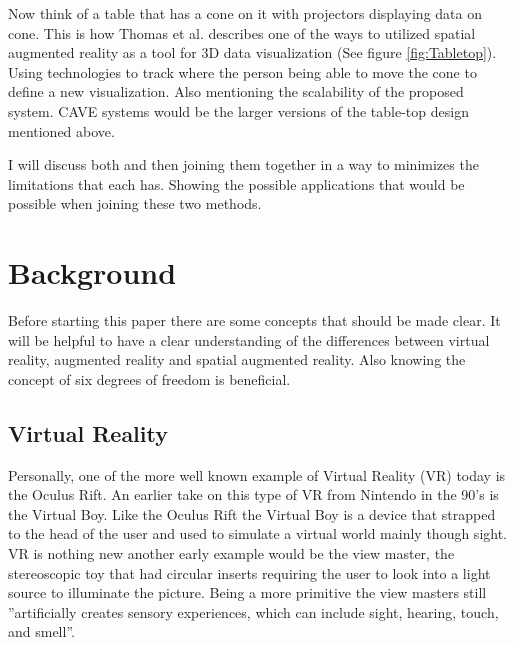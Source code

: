 \documentclass{sig-alternate}
\begin{document}
Now think of a table that has a cone on it with projectors displaying data on cone. This is how Thomas et al. describes one of the ways to utilized spatial augmented reality as a tool for 3D data visualization (See figure \ref{fig:Tabletop}). Using technologies to track where the person being able to move the cone to define a new visualization. Also mentioning the scalability of the proposed system. CAVE systems would be the larger versions of the table-top design mentioned above.      

I will discuss both and then joining them together in a way to minimizes the limitations that each has. Showing the possible applications that would be possible when joining these two methods.       


\section{Background}
\label{sec:background} 
Before starting this paper there are some concepts that should be made clear. It will be helpful to have a clear understanding of the differences between virtual reality, augmented reality and spatial augmented reality. Also knowing the concept of six degrees of freedom is beneficial.  

\subsection{Virtual Reality}
\label{sec:Virtual Reality}
Personally, one of the more well known example of Virtual Reality (VR) today is the Oculus Rift. An earlier take on this type of VR from Nintendo in the 90's is the Virtual Boy. Like the Oculus Rift the Virtual Boy is a device that strapped to the head of the user and used to simulate a virtual world mainly though sight. VR is nothing new another early example would be the view master, the stereoscopic toy that had circular inserts requiring the user to look into a light source to illuminate the picture. Being a more primitive the view masters still ''artificially creates sensory experiences, which can include sight, hearing, touch, and smell''\cite{VR}.       
\end{document}
